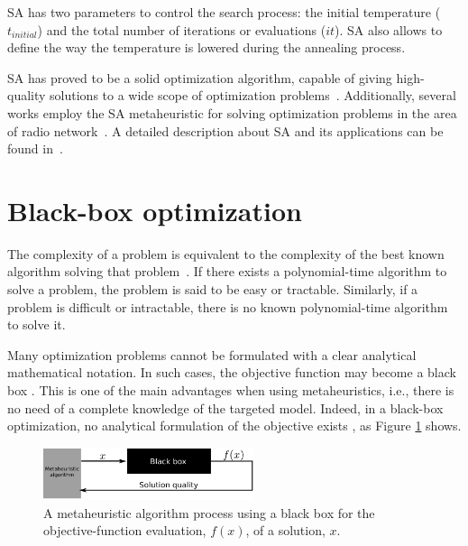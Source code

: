 SA has two parameters to control the search process: the initial temperature
($t_{initial}$) and the total number of iterations or evaluations
($it$). SA also allows to define the way the temperature is lowered
during the annealing process.

SA has proved to be a solid optimization algorithm, capable of giving
high-quality solutions to a wide scope of optimization problems~\cite{Suman_SurveyOfSimulatedAnnealing}.
Additionally, several works employ the SA metaheuristic for solving
optimization problems in the area of radio network~\cite{Benedicic_Balancing_downlink_uplink_soft_handover_areas_in_UMTS_networks:2012,Duque-Channel_assignment_for_cellular_radio_using_simulated_annealing:1993,CPICH.optimization:2003,minimum.set.covering.problem:2000,Coverage.optimization.on.CPICH.tilt.and.azimuth:2006,Zhang-Mathematical_modelling_and_comparisons_of_heuristics_for_WCDMA_radio_planning:2006}.
A detailed description about SA and its applications can be found
in~\cite{Van-Simulated_annealing:1987}.


\section{Black-box optimization \label{sub:02-Black_box_optimization}}

The complexity of a problem is equivalent to the complexity of the
best known algorithm solving that problem~\cite{Talbi-Metaheuristics_from_design_to_implementation:2009}.
If there exists a polynomial-time algorithm to solve a problem, the
problem is said to be easy or tractable. Similarly, if a problem is
difficult or intractable, there is no known polynomial-time algorithm
to solve it. 

Many optimization problems cannot be formulated with a clear analytical
mathematical notation. In such cases, the objective function may become
a black box \cite{Kargupta-Search_blackbox_optimization_and_sample_complexity:1996}.
This is one of the main advantages when using metaheuristics, i.e.,
there is no need of a complete knowledge of the targeted model. Indeed,
in a black-box optimization, no analytical formulation of the objective
exists \cite{Talbi-Metaheuristics_from_design_to_implementation:2009},
as Figure \ref{fig:02-black_box_optimization} shows.

\begin{figure}
\centering

\includegraphics[width=0.55\textwidth]{02-background_and_motivation/img/blackbox_optimization}

\caption{A metaheuristic algorithm process using a black box for the objective-function
evaluation, $f(x)$, of a solution, $x$. \label{fig:02-black_box_optimization}}
\end{figure}


